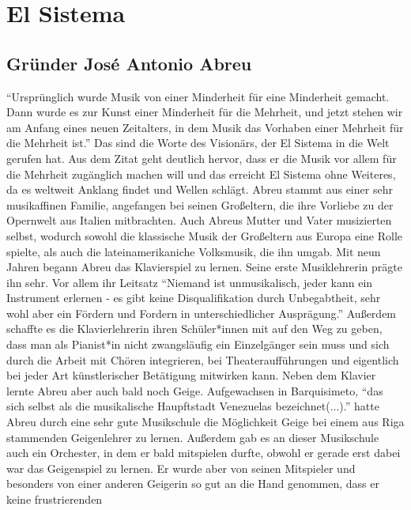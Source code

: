 \section{El Sistema}

\subsection{Gründer José Antonio Abreu}

\enquote{Ursprünglich wurde Musik von einer Minderheit für eine Minderheit
gemacht. Dann wurde es zur Kunst einer Minderheit für die Mehrheit, und jetzt
stehen wir am Anfang eines neuen Zeitalters, in dem Musik das Vorhaben einer
Mehrheit für die Mehrheit ist.} \autocite[5]{kaufmann:el_sistema} Das sind die
Worte des Visionärs, der El Sistema in die Welt gerufen hat. Aus dem Zitat geht
deutlich hervor, dass er die Musik vor allem für die Mehrheit zugänglich machen
will und das erreicht El Sistema ohne Weiteres, da es weltweit Anklang findet
und Wellen schlägt. Abreu stammt aus einer sehr musikaffinen Familie, angefangen
bei seinen Großeltern, die ihre Vorliebe zu der Opernwelt aus Italien
mitbrachten. Auch Abreus Mutter und Vater musizierten selbst, wodurch sowohl die
klassische Musik der Großeltern aus Europa eine Rolle spielte, als auch die
lateinamerikaniche Volksmusik, die ihn umgab. Mit neun Jahren begann Abreu das
Klavierspiel zu lernen. Seine erste Musiklehrerin prägte ihn sehr. Vor allem ihr
Leitsatz \enquote{Niemand ist unmusikalisch, jeder kann ein Instrument erlernen
- es gibt keine Disqualifikation durch Unbegabtheit, sehr wohl aber ein Fördern
und Fordern in unterschiedlicher Ausprägung.} \autocite[20]{kaufmann:el_sistema}
Außerdem schaffte es die Klavierlehrerin ihren Schüler*innen mit auf den Weg zu
geben, dass man als Pianist*in nicht zwangsläufig ein Einzelgänger sein muss und
sich durch die Arbeit mit Chören integrieren, bei Theateraufführungen und
eigentlich bei jeder Art künstlerischer Betätigung mitwirken kann. Neben dem
Klavier lernte Abreu aber auch bald noch Geige. Aufgewachsen in Barquisimeto,
\enquote{das sich selbst als die musikalische Haupftstadt Venezuelas
bezeichnet(...).} \autocite[22]{kaufmann:el_sistema} hatte Abreu durch eine sehr
gute Musikschule die Möglichkeit Geige bei einem aus Riga stammenden
Geigenlehrer zu lernen. Außerdem gab es an dieser Musikschule auch ein
Orchester, in dem er bald mitspielen durfte, obwohl er gerade erst dabei war das
Geigenspiel zu lernen. Er wurde aber von seinen Mitspieler und besonders von
einer anderen Geigerin so gut an die Hand genommen, dass er keine frustrierenden
